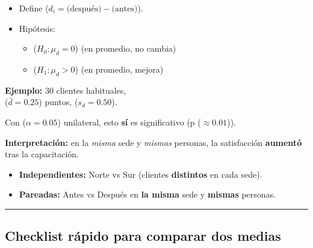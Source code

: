\documentclass[
  spanish,
  letterpaper,
  DIV=11,
  numbers=noendperiod]{scrreprt}
\providecommand{\tightlist}{%
  \setlength{\itemsep}{0pt}\setlength{\parskip}{0pt}}
\begin{document}
\begin{itemize}
\tightlist
\item
  Define (\(d_i = \text{(después)} - \text{(antes)}\)).\\
\item
  Hipótesis:

  \begin{itemize}
  \tightlist
  \item
    (\(H_0: \mu_d = 0\)) (en promedio, no cambia)
  \item
    (\(H_1: \mu_d > 0\)) (en promedio, mejora)
  \end{itemize}
\end{itemize}

\textbf{Ejemplo:} 30 clientes habituales,\\
(\(\bar{d} = 0.25\)) puntos, (\(s_d = 0.50\)).

Con (\(\alpha=0.05\)) unilateral, esto \textbf{sí} es significativo (p
(\(\approx 0.01\))).

\textbf{Interpretación:} en la \emph{misma} sede y \emph{mismas}
personas, la satisfacción \textbf{aumentó} tras la capacitación.

\begin{tcolorbox}[enhanced jigsaw, toptitle=1mm, opacitybacktitle=0.6, leftrule=.75mm, arc=.35mm, title=\textcolor{quarto-callout-important-color}{\faExclamation}\hspace{0.5em}{¿Independientes o pareadas?}, colback=white, bottomrule=.15mm, colbacktitle=quarto-callout-important-color!10!white, opacityback=0, bottomtitle=1mm, breakable, rightrule=.15mm, coltitle=black, left=2mm, titlerule=0mm, colframe=quarto-callout-important-color-frame, toprule=.15mm]

\begin{itemize}
\tightlist
\item
  \textbf{Independientes:} Norte vs Sur (clientes \textbf{distintos} en
  cada sede).\\
\item
  \textbf{Pareadas:} Antes vs Después en \textbf{la misma} sede y
  \textbf{mismas} personas.
\end{itemize}

\end{tcolorbox}

\begin{center}\rule{0.5\linewidth}{0.5pt}\end{center}

\subsection{Checklist rápido para comparar dos
medias}\label{checklist-ruxe1pido-para-comparar-dos-medias}
\end{document}
